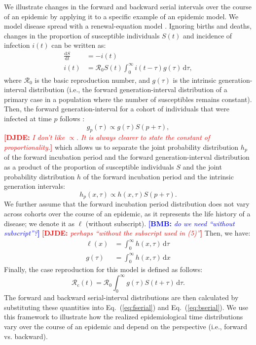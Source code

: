 \documentclass[12pt]{article}
\newcommand{\comment}{\showcomment}
\newcommand{\showcomment}[3]{\textcolor{#1}{\textbf{[#2: }\textsl{#3}\textbf{]}}}
\newcommand{\bmb}[1]{\comment{blue}{BMB}{#1}}
\newcommand{\djde}[1]{\comment{red}{DJDE}{#1}}
\newcommand{\eref}[1]{Eq.~(\ref{eq:#1})}
\newcommand{\Rx}[1]{\ensuremath{{\mathcal R}_{#1}}\xspace}
\newcommand{\Ro}{\Rx{0}}
\newcommand{\Rc}{\Rx{\mathrm{c}}}
\newcommand{\dd}[1]{\ensuremath{\, \mathrm{d}#1}}
\newcommand{\dtau}{\dd{\tau}}
\newcommand{\dx}{\dd{x}}
\newcommand{\psymp}{\ensuremath{p}} %
\newcommand{\gdist}{g} %
\newcommand{\idist}{\ell} %
\begin{document}
We illustrate changes in the forward and backward serial intervals over the course of an epidemic by applying it to a specific example of an epidemic model. 
We model disease spread with a renewal-equation model \citep{heesterbeek1996concept, diekmann2000mathematical, roberts2004modelling, aldis2005integral, roberts2007model, champredon2018equivalence}.
Ignoring births and deaths, changes in the proportion of susceptible individuals $S(t)$ and incidence of infection $i(t)$ can be written as:
\begin{align}
\frac{\mathrm{d}S}{\mathrm{d}t} &= - i(t)\nonumber\\
i(t) &= \Ro S(t) \int_0^\infty i(t-\tau) \gdist(\tau) \dtau,
\label{eq:renewal}
\end{align}
where \Ro is the basic reproduction number, and $\gdist(\tau)$ is the intrinsic generation-interval distribution (i.e., the forward generation-interval distribution of a primary case in a population where the number of susceptibles remains constant).
Then, the forward generation-interval for a cohort of individuals that were infected at time $\psymp$ follows \citep{champredon2015intrinsic}:
\begin{equation}
\gdist_\psymp (\tau) \propto \gdist(\tau) S(\psymp + \tau),
\end{equation}
\djde{I don't like $\propto$.  It is always clearer to state the
  constant of proportionality.}
which allows us to separate the joint probability distribution $h_\psymp$ of the forward incubation period and the forward generation-interval distribution as a product of the proportion of susceptible individuals $S$ and the joint probability distribution $h$ of the forward incubation period and the intrinsic generation intervals:
\begin{equation}
h_\psymp (x, \tau) \propto h(x, \tau) S(\psymp + \tau).
\end{equation}
We further assume that the forward incubation period distribution does
not vary across cohorts over the course of an epidemic, as it
represents the life history of a disease; we denote it as $\idist$
(without subscript). \bmb{do we need ``without subscript''?}
\djde{perhaps ``without the subscript used in (5)''}
Then, we have:
\begin{align}
\idist(x) &= \int_0^\infty h(x, \tau) \dtau\nonumber\\
\gdist(\tau) &= \int_0^\infty h(x, \tau) \dx
\label{eq:marginal}
\end{align}
Finally, the case reproduction for this model is defined as follows:
\begin{equation}
\Rc(t) = \Ro \int_0^\infty \gdist(\tau) S(t+\tau) \dtau.
\end{equation}
The forward and backward serial-interval distributions are then calculated by substituting these quantities into \eref{fserial} and \eref{bserial}.
We use this framework to illustrate how the realized epidemiological time distributions vary over the course of an epidemic and depend on the perspective (i.e., forward vs. backward).
\end{document}
